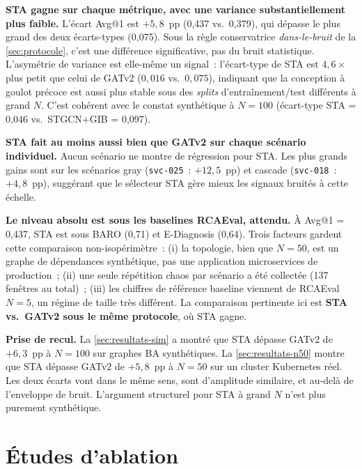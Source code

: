 \documentclass[a4paper,11pt,oneside]{report}
\begin{document}
\textbf{STA gagne sur chaque m\'etrique, avec une variance substantiellement plus faible.} L'\'ecart Avg@1 est $+5{,}8$~pp (0{,}437 vs.\ 0{,}379), qui d\'epasse le plus grand des deux \'ecarts-types (0{,}075). Sous la r\`egle conservatrice \emph{dans-le-bruit} de la \cref{sec:protocole}, c'est une diff\'erence significative, pas du bruit statistique. L'asym\'etrie de variance est elle-m\^eme un signal~: l'\'ecart-type de STA est $4{,}6\times$ plus petit que celui de GATv2 ($0{,}016$ vs.\ $0{,}075$), indiquant que la conception \`a goulot pr\'ecoce est aussi plus stable sous des \emph{splits} d'entra\^inement/test diff\'erents \`a grand $N$. C'est coh\'erent avec le constat synth\'etique \`a $N{=}100$ (\'ecart-type STA = 0{,}046 vs.\ STGCN+GIB = 0{,}097).

\textbf{STA fait au moins aussi bien que GATv2 sur chaque sc\'enario individuel.} Aucun sc\'enario ne montre de r\'egression pour STA. Les plus grands gains sont sur les sc\'enarios gray (\texttt{svc-025}~: $+12{,}5$~pp) et cascade (\texttt{svc-018}~: $+4{,}8$~pp), sugg\'erant que le s\'electeur STA g\`ere mieux les signaux bruit\'es \`a cette \'echelle.

\textbf{Le niveau absolu est sous les baselines RCAEval, attendu.} \`A Avg@1 = 0{,}437, STA est sous BARO (0{,}71) et E-Diagnosis (0{,}64). Trois facteurs gardent cette comparaison non-isop\'erim\`etre~: (i) la topologie, bien que $N{=}50$, est un graphe de d\'ependances synth\'etique, pas une application microservices de production~; (ii) une seule r\'ep\'etition chaos par sc\'enario a \'et\'e collect\'ee (137 fen\^etres au total)~; (iii) les chiffres de r\'ef\'erence baseline viennent de RCAEval $N{=}5$, un r\'egime de taille tr\`es diff\'erent. La comparaison pertinente ici est \textbf{STA vs.\ GATv2 sous le m\^eme protocole}, o\`u STA gagne.

\textbf{Prise de recul.} La \cref{sec:resultats-sim} a montr\'e que STA d\'epasse GATv2 de $+6{,}3$~pp \`a $N{=}100$ sur graphes BA synth\'etiques. La \cref{sec:resultats-n50} montre que STA d\'epasse GATv2 de $+5{,}8$~pp \`a $N{=}50$ sur un cluster Kubernetes r\'eel. Les deux \'ecarts vont dans le m\^eme sens, sont d'amplitude similaire, et au-del\`a de l'enveloppe de bruit. L'argument structurel pour STA \`a grand $N$ n'est plus purement synth\'etique.

\section{\'Etudes d'ablation}
\label{sec:resultats-ablation}
\end{document}
